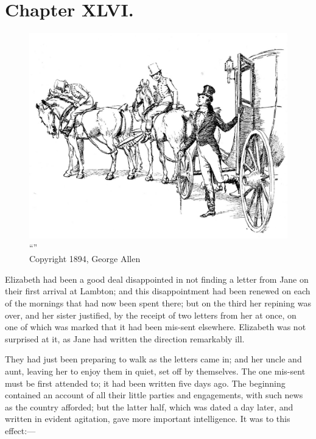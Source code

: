 \chapter{Chapter XLVI.}

\begin{figure}[htbp]
    \centering
    \includegraphics[width=\textwidth]{illustrations/i_031.jpg}
    \caption{“”\\ Copyright 1894, George Allen}
    \label{fig:image}
\end{figure}


Elizabeth had been a good deal disappointed in not finding a letter from Jane on their first arrival at Lambton; and this disappointment had been renewed on each of the mornings that had now been spent there; but on the third her repining was over, and her sister justified, by the receipt of two letters from her at once, on one of which was marked that it had been mis-sent elsewhere. Elizabeth was not surprised at it, as Jane had written the direction remarkably ill.

They had just been preparing to walk as the letters came in; and her uncle and aunt, leaving her to enjoy them in quiet, set off by themselves. The one mis-sent must be first attended to; it had been written five days ago. The beginning contained an account of all their little parties and engagements, with such news as the country afforded; but the latter half, which was dated a day later, and written in evident agitation, gave more important intelligence. It was to this effect:---

